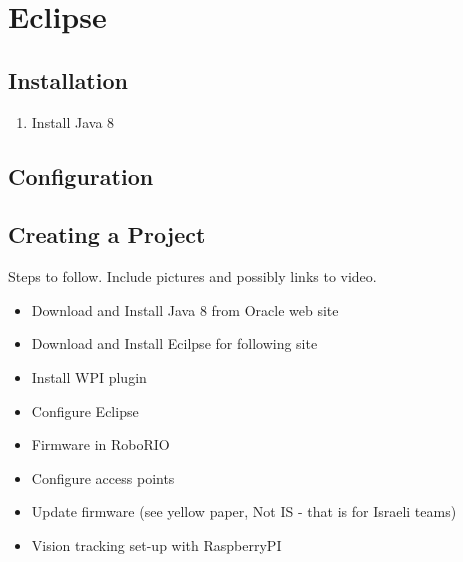 \chapter{Eclipse}


\section{Installation}

\begin{enumerate}
\item Install Java 8
\end{enumerate}



\section{Configuration}



\section{Creating a Project}




Steps to follow. Include pictures and possibly links to video.

\begin{itemize}
	\item Download and Install Java 8 from Oracle web site
	\item Download and Install Ecilpse for following site
	\item Install WPI plugin
	\item Configure Eclipse
	\item Firmware in RoboRIO
	\item Configure access points
	\item Update firmware (see yellow paper, Not IS - that is for Israeli teams)
	\item Vision tracking set-up with RaspberryPI
\end{itemize}
